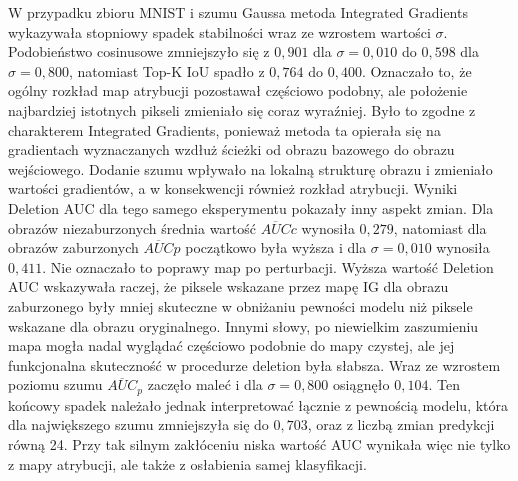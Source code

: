 W przypadku zbioru MNIST i szumu Gaussa metoda Integrated Gradients wykazywała stopniowy spadek stabilności wraz ze wzrostem wartości $\sigma$. Podobieństwo cosinusowe zmniejszyło się z $0{,}901$ dla $\sigma = 0{,}010$ do $0{,}598$ dla $\sigma = 0{,}800$, natomiast Top-K IoU spadło z $0{,}764$ do $0{,}400$. Oznaczało to, że ogólny rozkład map atrybucji pozostawał częściowo podobny, ale położenie najbardziej istotnych pikseli zmieniało się coraz wyraźniej. Było to zgodne z charakterem Integrated Gradients, ponieważ metoda ta opierała się na gradientach wyznaczanych wzdłuż ścieżki od obrazu bazowego do obrazu wejściowego. Dodanie szumu wpływało na lokalną strukturę obrazu i  zmieniało wartości gradientów, a w konsekwencji również rozkład atrybucji. Wyniki Deletion AUC dla tego samego eksperymentu pokazały inny aspekt zmian. Dla obrazów niezaburzonych średnia wartość $\overline{AUC}{c}$ wynosiła $0{,}279$, natomiast dla obrazów zaburzonych $\overline{AUC}{p}$ początkowo była wyższa i dla $\sigma = 0{,}010$ wynosiła $0{,}411$. Nie oznaczało to poprawy map po perturbacji. Wyższa wartość Deletion AUC wskazywała raczej, że piksele wskazane przez mapę IG dla obrazu zaburzonego były mniej skuteczne w obniżaniu pewności modelu niż piksele wskazane dla obrazu oryginalnego. Innymi słowy, po niewielkim zaszumieniu mapa mogła nadal wyglądać częściowo podobnie do mapy czystej, ale jej funkcjonalna skuteczność w procedurze deletion była słabsza. Wraz ze wzrostem poziomu szumu $\overline{AUC}_{p}$ zaczęło maleć i dla $\sigma = 0{,}800$ osiągnęło $0{,}104$. Ten końcowy spadek należało jednak interpretować łącznie z pewnością modelu, która dla największego szumu zmniejszyła się do $0{,}703$, oraz z liczbą zmian predykcji równą 24. Przy tak silnym zakłóceniu niska wartość AUC wynikała więc nie tylko z mapy atrybucji, ale także z osłabienia samej klasyfikacji. 

